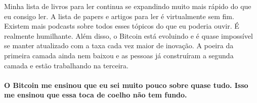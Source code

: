 Minha lista de livros para ler continua se expandindo muito mais rápido do que eu consigo ler. A lista de papers e artigos para ler é virtualmente sem fim. Existem mais podcasts sobre todos esses tópicos do que eu poderia ouvir. É realmente humilhante. Além disso, o Bitcoin está evoluindo e é quase impossível se manter atualizado com a taxa cada vez maior de inovação. A poeira da primeira camada ainda nem baixou e as pessoas já construíram a segunda camada e estão trabalhando na terceira.

\paragraph{O Bitcoin me ensinou que eu sei muito pouco sobre quase tudo. Isso me ensinou que essa toca de coelho não tem fundo.}

%
%
%
%
%
